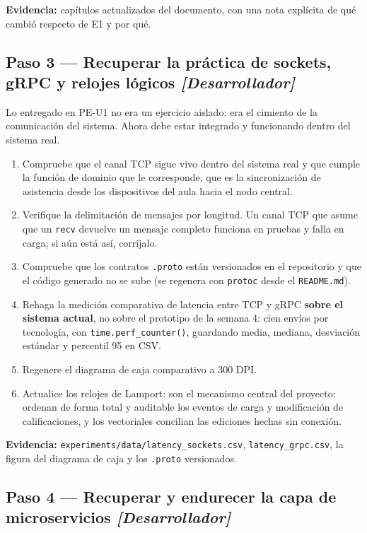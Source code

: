 \documentclass[11pt,a4paper]{article}
\newcommand{\paso}[1]{\subsection{#1}}
\begin{document}
	\textbf{Evidencia:} capítulos actualizados del documento, con una nota explícita de qué cambió respecto de E1 y por qué.
	
	\paso{Paso 3 --- Recuperar la práctica de sockets, gRPC y relojes lógicos \emph{[Desarrollador]}}
	
	Lo entregado en PE-U1 no era un ejercicio aislado: era el cimiento de la comunicación del sistema. Ahora debe estar integrado y funcionando dentro del sistema real.
	
	\begin{enumerate}[leftmargin=*,itemsep=4pt]
		\item Compruebe que el canal TCP sigue vivo dentro del sistema real y que cumple la función de dominio que le corresponde, que es la sincronización de asistencia desde los dispositivos del aula hacia el nodo central.
		\item Verifique la delimitación de mensajes por longitud. Un canal TCP que asume que un \texttt{recv} devuelve un mensaje completo funciona en pruebas y falla en carga; si aún está así, corríjalo.
		\item Compruebe que los contratos \texttt{.proto} están versionados en el repositorio y que el código generado no se sube (se regenera con \texttt{protoc} desde el \texttt{README.md}).
		\item Rehaga la medición comparativa de latencia entre TCP y gRPC \textbf{sobre el sistema actual}, no sobre el prototipo de la semana 4: cien envíos por tecnología, con \texttt{time.perf\_counter()}, guardando media, mediana, desviación estándar y percentil 95 en CSV.
		\item Regenere el diagrama de caja comparativo a 300 DPI.
		\item Actualice los relojes de Lamport: son el mecanismo central del proyecto: ordenan de forma total y auditable los eventos de carga y modificación de calificaciones, y los vectoriales concilian las ediciones hechas sin conexión.
	\end{enumerate}
	
	\textbf{Evidencia:} \texttt{experiments/data/latency\_sockets.csv}, \texttt{latency\_grpc.csv}, la figura del diagrama de caja y los \texttt{.proto} versionados.
	
	\paso{Paso 4 --- Recuperar y endurecer la capa de microservicios \emph{[Desarrollador]}}
	
\end{document}
